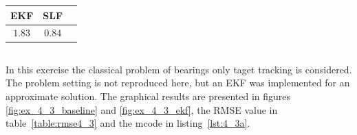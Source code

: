 \documentclass[a4paper,oneside,article]{memoir}
\newcommand{\otoprule}{\midrule[\heavyrulewidth]}
\begin{document}
\begin{table}[h]
	\centering
	\begin{tabular}{c c c}
		\otoprule
		EKF & SLF\\
		\midrule
		$1.83$ & $0.84$\\
		\bottomrule
	\end{tabular}
	\label{table:rmse4_1}
\end{table}






\subsection{}

\subsection{}\label{sec:4_3}
\subsubsection{}\label{sec:4_3a}
In this exercise the classical problem of bearings only taget tracking is considered.
The problem setting is not reproduced here, but an EKF was implemented for an approximate
solution. The graphical results are presented in figures \ref{fig:ex_4_3_baseline} and \ref{fig:ex_4_3_ekf}, the RMSE value
in table~\ref{table:rmse4_3} and the mcode in listing~\ref{lst:4_3a}.

\end{document}
